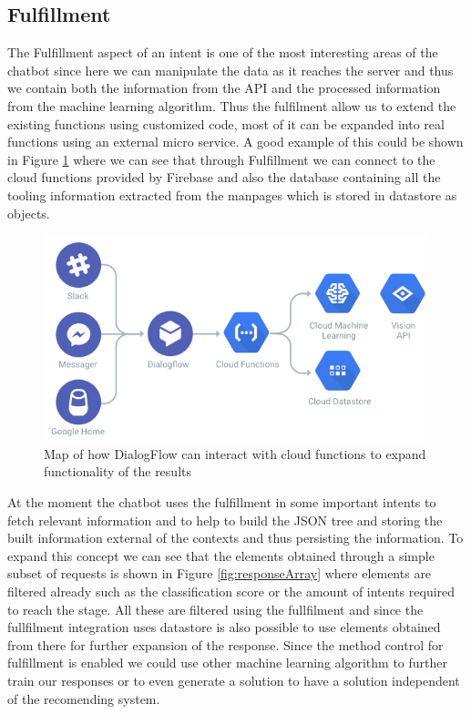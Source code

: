 \subsection{Fulfillment}
The Fulfillment aspect of an intent is one of the most interesting areas of the chatbot since here we can manipulate the data as it reaches the server and thus we contain both the information from the API and the processed information from the machine learning algorithm. Thus the fulfilment allow us to extend the existing functions using customized code, most of it can be expanded into real functions using an external micro service. A good example of this could be shown in Figure \ref{fig:cloudFunction} where we can see that through Fulfillment we can connect to the cloud functions provided by Firebase and also the database containing all the tooling information extracted from the manpages which is stored in datastore as objects.

\begin{figure}[!h]
    \centering
    \includegraphics[scale=0.60]{MA-BA-Thesis/cloudFunctions.png}
    \caption{Map of how DialogFlow can interact with cloud functions to expand functionality of the results}
    \label{fig:cloudFunction}
\end{figure}

At the moment the chatbot uses the fulfillment in some important intents to fetch relevant information and to help to build the JSON tree and storing the built information external of the contexts and thus persisting the information. To expand this concept we can see that the elements obtained through a simple subset of requests is shown in Figure \ref{fig:responseArray} where elements are filtered already such as the classification score or the amount of intents required to reach the stage. All these are filtered using the fullfilment and since the fullfilment integration uses datastore is also possible to use elements obtained from there for further expansion of the response. Since the method control for fulfillment is enabled we could use other machine learning algorithm to further train our responses or to even generate a solution to have a solution independent of the recomending system.

